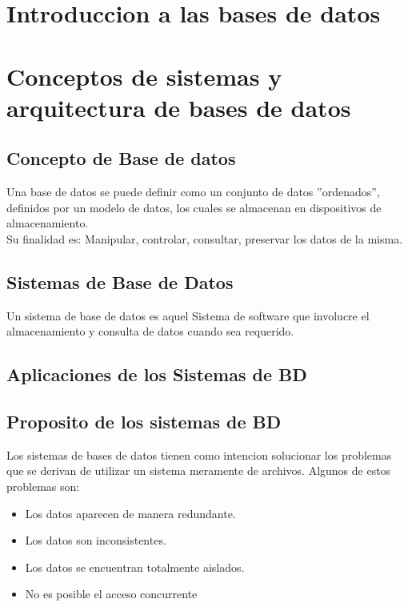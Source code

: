 \documentclass[twoside]{article}
\begin{document}
\selectfont
\tableofcontents
\newpage

\section{Introduccion a las bases de datos}

\section{Conceptos de sistemas y arquitectura de bases de datos}

\subsection{Concepto de Base de datos}

Una base de datos se puede definir como un conjunto de datos ''ordenados'', definidos por un modelo de datos, los cuales se almacenan en dispositivos de almacenamiento.\\

Su finalidad es: Manipular, controlar, consultar, preservar los datos de la misma.

\subsection{Sistemas de Base de Datos} %

Un sistema de base de datos es aquel Sistema de software que involucre el almacenamiento y consulta de datos cuando sea requerido.

\subsection{Aplicaciones de los Sistemas de BD}



\subsection{Proposito de los sistemas de BD}

Los sistemas de bases de datos tienen como intencion solucionar los problemas que se derivan de utilizar un sistema meramente de archivos.
Algunos de estos problemas son:

\begin{itemize}
  \item Los datos aparecen de manera redundante.
  \item Los datos son inconsistentes.
  \item Los datos se encuentran totalmente aislados.
  \item No es posible el acceso concurrente
\end{itemize}
\end{document}
